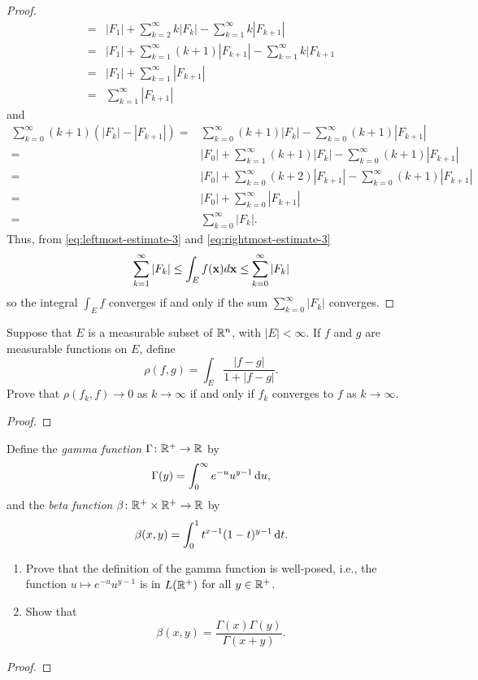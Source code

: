 \begin{proof}
\begin{equation}
\begin{aligned}
={}&|F_1|+\sum_{k=2}^\infty k|F_k|-\sum_{k=1}^\infty k|F_{k+1}|\\
={}&|F_1|+\sum_{k=1}^\infty(k+1)|F_{k+1}|-\sum_{k=1}^\infty k|F_{k+1}\\
={}&|F_1|+\sum_{k=1}^\infty |F_{k+1}|\\
={}&\sum_{k=1}^\infty|F_{k+1}|
\end{aligned}
\end{equation}
and
\begin{equation}
\label{eq:rightmost-estimate-3}
\begin{aligned}
\sum_{k=0}^\infty(k+1)\left(|F_k|-|F_{k+1}|\right)
={}&\sum_{k=0}^\infty(k+1)|F_k|-\sum_{k=0}^\infty(k+1)|F_{k+1}|\\
={}&|F_0|+\sum_{k=1}^\infty(k+1)|F_k|-\sum_{k=0}^\infty(k+1)|F_{k+1}|\\
={}&|F_0|+\sum_{k=0}^\infty(k+2)|F_{k+1}|-\sum_{k=0}^\infty(k+1)|F_{k+1}|\\
={}&|F_0|+\sum_{k=0}^\infty|F_{k+1}|\\
={}&\sum_{k=0}^\infty|F_k|.
\end{aligned}
\end{equation}
Thus, from \eqref{eq:leftmost-estimate-3} and
\eqref{eq:rightmost-estimate-3}
\begin{equation}
\label{eq:final-upper-lower-estimates-3}
\sum_{k=1}^\infty|F_k|\leq\int_E f(\mathbf{x}) d \mathbf{x}\leq\sum_{k=0}^\infty|F_k|
\end{equation}
so the integral $\int_E f$ converges if and only if the sum
$\sum_{k=0}^\infty|F_k|$ converges.
\end{proof}
\begin{problem}
Suppose that $E$ is a measurable subset of $\mathbb{R}^n$, with
$|E|<\infty$. If $f$ and $g$ are measurable functions on
$E$, define
\[
\rho(f,g)=\int_E\frac{|f-g|}{1+|f-g|}.
\]
Prove that $\rho(f_k,f)\to 0$ as $k\to\infty$ if and only if $f_k$
converges to $f$ as $k\to\infty$.
\end{problem}
\begin{proof}
\end{proof}

\begin{problem}
Define the \emph{gamma function} $\Gamma\colon\mathbb{R}^+\to\mathbb{R}$ by
\[
\Gamma(y)=\int_0^\infty e^{-u}u^{y-1}\mathop{}\!\mathrm{d} u,
\]
and the \emph{beta function} $\beta\colon\mathbb{R}^+\times\mathbb{R}^+\to\mathbb{R}$
by
\[
\beta(x,y)=\int_0^1 t^{x-1}(1-t)^{y-1}\mathop{}\!\mathrm{d} t.
\]
\begin{enumerate}[label=(\alph*),noitemsep]
\item Prove that the definition of the gamma function is well-posed, i.e.,
the function $u\mapsto e^{-u}u^{y-1}$ is in $L(\mathbb{R}^+)$ for all
$y\in\mathbb{R}^+$.
\item Show that
\[
\beta(x,y)=\frac{\Gamma(x)\Gamma(y)}{\Gamma(x+y)}.
\]
\end{enumerate}
\end{problem}
\begin{proof}
\end{proof}

